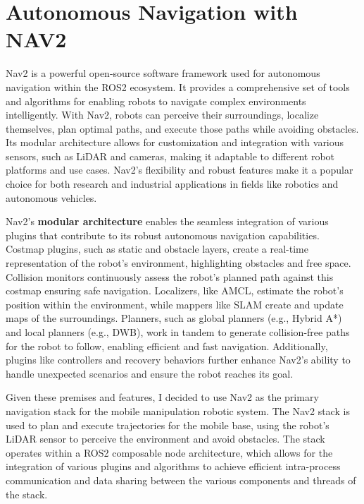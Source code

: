 \section{Autonomous Navigation with NAV2}

Nav2 is a powerful open-source software framework used for autonomous navigation within the ROS2 ecosystem.
It provides a comprehensive set of tools and algorithms for enabling robots to navigate complex environments intelligently.
With Nav2, robots can perceive their surroundings, localize themselves, plan optimal paths, and execute 
those paths while avoiding obstacles. Its modular architecture allows for customization and integration with various sensors,
such as LiDAR and cameras, making it adaptable to different robot platforms and use cases. 
Nav2's flexibility and robust features make it a popular choice for both research and industrial applications 
in fields like robotics and autonomous vehicles.

Nav2's \textbf{modular architecture} enables the seamless integration of various plugins that contribute
to its robust autonomous navigation capabilities. Costmap plugins, such as static and obstacle layers,
create a real-time representation of the robot's environment, highlighting obstacles and free space. 
Collision monitors continuously assess the robot's planned path against this costmap ensuring safe navigation.
Localizers, like AMCL, estimate the robot's position within the environment, while mappers like SLAM create and update maps
of the surroundings. Planners, such as global planners (e.g., Hybrid A*) and local planners (e.g., DWB),
work in tandem to generate collision-free paths for the robot to follow, enabling efficient and fast navigation. 
Additionally, plugins like controllers and recovery behaviors further enhance Nav2's ability to handle unexpected
scenarios and ensure the robot reaches its goal.

Given these premises and features, I decided to use Nav2 as the primary navigation stack for the mobile manipulation
robotic system. The Nav2 stack is used to plan and execute trajectories for the mobile base, using the robot's
LiDAR sensor to perceive the environment and avoid obstacles. The stack operates within a ROS2 
composable node architecture, which allows for the integration of various plugins and algorithms to achieve
efficient intra-process communication and data sharing between the various components and threads of the stack.


